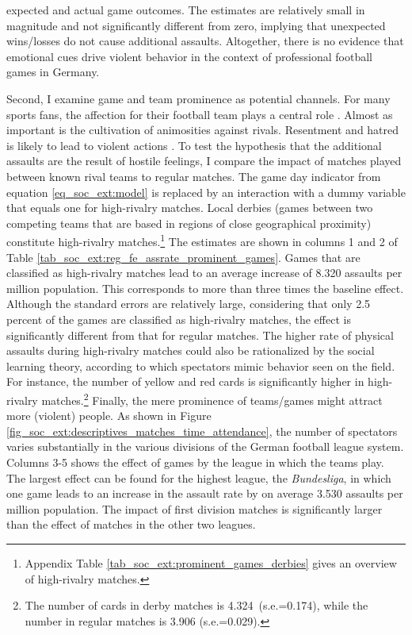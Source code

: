 expected and actual game outcomes. The estimates are relatively small in magnitude and not significantly different from zero, implying that unexpected wins/losses do not cause additional assaults. Altogether, there is no evidence that emotional cues drive violent behavior in the context of professional football games in Germany.






Second, I examine game and team prominence as potential channels. For many sports fans, the affection for their football team plays a central role \citep{wann1993sports}. Almost as important is the cultivation of animosities against rivals. Resentment and hatred is likely to lead to violent actions \citep{nassauer2011hate}. To test the hypothesis that the additional assaults are the result of hostile feelings, I compare the impact of matches played between known rival teams to regular matches. The game day indicator from equation \ref{eq_soc_ext:model} is replaced by an interaction with a dummy variable that equals one for high-rivalry matches. Local derbies (games between two competing teams that are based in regions of close geographical proximity) constitute high-rivalry matches.\footnote{Appendix Table \ref{tab_soc_ext:prominent_games_derbies} gives an overview of high-rivalry matches.} The estimates are shown in columns 1 and 2 of Table \ref{tab_soc_ext:reg_fe_assrate_prominent_games}. Games that are classified as high-rivalry matches lead to an average increase of 8.320 assaults per million population. This corresponds to more than three times the baseline effect. Although the standard errors are relatively large, considering that only 2.5 percent of the games are classified as high-rivalry matches, the effect is significantly different from that for regular matches. The higher rate of physical assaults during high-rivalry matches could also be rationalized by the social learning theory, according to which spectators mimic behavior seen on the field. For instance, the number of yellow and red cards is significantly higher in high-rivalry matches.\footnote{The number of cards in derby matches is 4.324\ (s.e.=0.174), while the number in regular matches is 3.906 (s.e.=0.029).} Finally, the mere prominence of teams/games might attract more (violent) people. As shown in Figure \ref{fig_soc_ext:descriptives_matches_time_attendance}, the number of spectators varies substantially in the various divisions of the German football league system. Columns 3-5 shows the effect of games by the league in which the teams play. The largest effect can be found for the highest league, the \textit{Bundesliga}, in which one game leads to an increase in the assault rate by on average 3.530 assaults per million population. The impact of first division matches is significantly larger than the effect of matches in the other two leagues.
